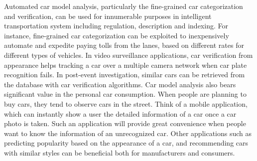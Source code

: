 \documentclass[10pt,twocolumn,letterpaper]{article}
\begin{document}
Automated car model analysis, particularly the fine-grained car categorization and verification, can be used for innumerable purposes in intelligent transportation system including regulation, description and indexing.
%
For instance, fine-grained car categorization can be exploited to inexpensively automate and expedite paying tolls from the lanes, based on different rates for different types of vehicles.
%
%
In video surveillance applications, car verification from appearance helps tracking a car over a multiple camera network when car plate recognition fails.
%
In post-event investigation, similar cars can be retrieved from the database with car verification algorithms.
%
Car model analysis also bears significant value in the personal car consumption.
%
When people are planning to buy cars, they tend to observe cars in the street. Think of a mobile application, which can instantly show a user the detailed information of a car once a car photo is taken. Such an application will provide great convenience when people want to know the information of an unrecognized car. Other applications such as predicting popularity based on the appearance of a car, and recommending cars with similar styles can be beneficial both for manufacturers and consumers.



\end{document}
